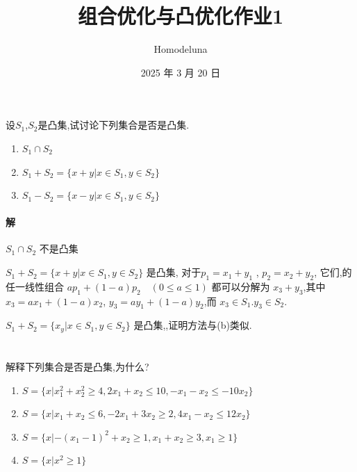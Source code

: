 \documentclass[a4paper]{article}
\title{组合优化与凸优化作业1}
\author{Homodeluna}
\date{2025 年 3 月 20 日}
\begin{document}
\maketitle
\section{}
设$S_1$,$S_2$是凸集,试讨论下列集合是否是凸集.
\begin{enumerate}
    \item $S_1 \cap S_2$
    \item $S_1 + S_2 = \{x+y | x \in S_1, y\in S_2\}$
    \item $S_1 - S_2 = \{x-y | x \in S_1, y\in S_2\}$
\end{enumerate}

\paragraph{解}
$S_1 \cap S_2$ 不是凸集


$S_1 + S_2 = \{x+y | x \in S_1, y\in S_2\}$ 是凸集, 对于$p_1 = x_1 + y_1$ , $p_2 = x_2 + y_2$,
它们,的任一线性组合 $ap_1 + (1-a)p_2 \quad (0 \leq a \leq 1)$ 都可以分解为 $x_3 + y_3$,其中 $x_3 = ax_1 + (1-a)x_2$, $y_3 = ay_1 + (1-a)y_2$,而 $x_3 \in S_1. y_3 \in S_2$.

$S_1 + S_2 = \{x_y | x \in S_1, y\in S_2\}$ 是凸集,,证明方法与(b)类似.


\section{}

解释下列集合是否是凸集,为什么?
\begin{enumerate}
    \item $S = \{x | x_1^2 + x_2^2 \geq 4, 2 x_1 + x_2 \leq 10, -x_1 - x_2 \leq -10 x_2\}$
    \item $S = \{x | x_1 + x_2 \leq 6, -2 x_1 + 3x_2 \geq 2, 4x_1 - x_2 \leq 12 x_2\}$
    \item $S = \{x | -(x_1 -1)^2 + x_2 \geq 1,  x_1 + x_2 \geq 3, x_1 \geq 1\}$
    \item $S = \{x | x^2 \geq 1\}$
\end{enumerate}
\end{document}
